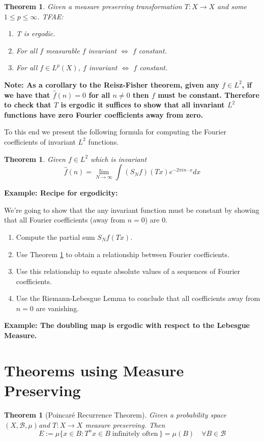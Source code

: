 \documentclass[11pt]{article}
\newcommand{\defeq}{:=}
\newcommand{\msrspc}{\ensuremath{(X,\mathcal{B},\mu)}}
\newenvironment{note}
	{\begin{mdframed}[backgroundcolor=white, linecolor=red, roundcorner=5pt, linewidth=1pt]\bfseries{Note:}\normalfont}
	{\end{mdframed}}
\newenvironment{eg}
	{\begin{mdframed}[backgroundcolor=mylg,roundcorner=5pt,linewidth=0pt]\bfseries{Example:}\normalfont}
	{\end{mdframed}}
\newtheorem{theorem}[prop]{Theorem}
\begin{document}
\begin{theorem}
Given a measure preserving transformation $T:X\to X$ and some $1\leq p\leq\infty$. TFAE:
\begin{enumerate}
	\item T is ergodic.
	\item For all $f$ measurable $f$ invariant $\iff$ $f$ constant.
	\item For all $f\in L^p(X)$, $f$ invariant $\iff$ $f$ constant.
\end{enumerate}
\end{theorem}
\begin{note}
	As a corollary to the Reisz-Fisher theorem, given any $f\in L^2$, if we have that $\hat{f}(n)=0$ for all $n\neq 0$ then $f$ must be constant.
Therefore to check that $T$ is ergodic it suffices to show that all invariant $L^2$ functions have zero Fourier coefficients away from zero.
\end{note}
To this end we present the following formula for computing the Fourier coefficients of invariant $L^2$ functions.
\begin{theorem}
\label{th:coeffcompute}
Given $f\in L^2$ which is invariant
$$\hat{f}(n)=\lim_{N\to\infty}\int (S_Nf)(Tx)e^{-2\pi i n\cdot x}dx$$
\end{theorem}

\begin{eg}
	\textbf{Recipe for ergodicity:}

	We're going to show that the any invariant function must be constant by showing that all Fourier coefficients (away from $n=0$) are $0$.

	\begin{enumerate}
		\item Compute the partial sum $S_Nf(Tx)$.
		\item Use Theorem \ref{th:coeffcompute} to obtain a relationship between Fourier coefficients.
		\item Use this relationship to equate absolute values of a sequences of Fourier coefficients.
		\item Use the Riemann-Lebesgue Lemma to conclude that all coefficients away from $n=0$ are vanishing.
	\end{enumerate}
\end{eg}

\begin{eg}
	\textbf{The doubling map is ergodic with respect to the Lebesgue Measure.}
\end{eg}

\section{Theorems using Measure Preserving}
\begin{theorem}[Poincar\'e Recurrence Theorem]
	Given a probability space \msrspc and $T:X\to X$ measure preserving. Then
	$$E\defeq\mu\{x\in B : T^nx\in B \; \text{infinitely often}\,\}=\mu(B)\quad \forall B\in\mathcal{B}$$
\end{theorem}
\end{document}
